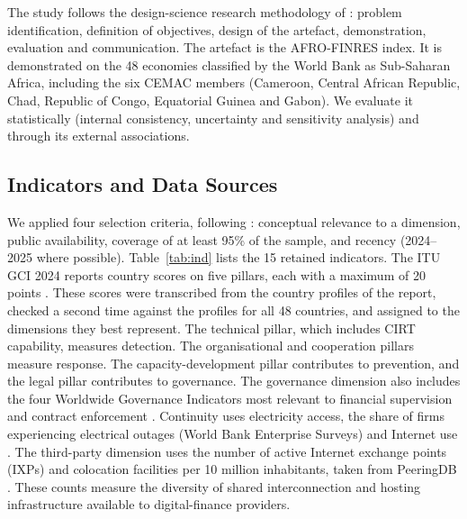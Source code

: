 \documentclass[11pt,a4paper]{article}
\begin{document}
The study follows the design-science research methodology of \citet{Peffers2007}: problem identification, definition of objectives, design of the artefact, demonstration, evaluation and communication. The artefact is the AFRO-FINRES index. It is demonstrated on the 48 economies classified by the World Bank as Sub-Saharan Africa, including the six CEMAC members (Cameroon, Central African Republic, Chad, Republic of Congo, Equatorial Guinea and Gabon). We evaluate it statistically (internal consistency, uncertainty and sensitivity analysis) and through its external associations.

\subsection{Indicators and Data Sources}

We applied four selection criteria, following \citet{OECD2008}: conceptual relevance to a dimension, public availability, coverage of at least 95\% of the sample, and recency (2024--2025 where possible). Table~\ref{tab:ind} lists the 15 retained indicators. The ITU GCI 2024 reports country scores on five pillars, each with a maximum of 20 points \citep{ITU2024GCI}. These scores were transcribed from the country profiles of the report, checked a second time against the profiles for all 48 countries, and assigned to the dimensions they best represent. The technical pillar, which includes CIRT capability, measures detection. The organisational and cooperation pillars measure response. The capacity-development pillar contributes to prevention, and the legal pillar contributes to governance. The governance dimension also includes the four Worldwide Governance Indicators most relevant to financial supervision and contract enforcement \citep{Kaufmann2011,WB2025WGI}. Continuity uses electricity access, the share of firms experiencing electrical outages (World Bank Enterprise Surveys) and Internet use \citep{WBWDI}. The third-party dimension uses the number of active Internet exchange points (IXPs) and colocation facilities per 10 million inhabitants, taken from PeeringDB \citep{PeeringDB2026}. These counts measure the diversity of shared interconnection and hosting infrastructure available to digital-finance providers.
\end{document}
